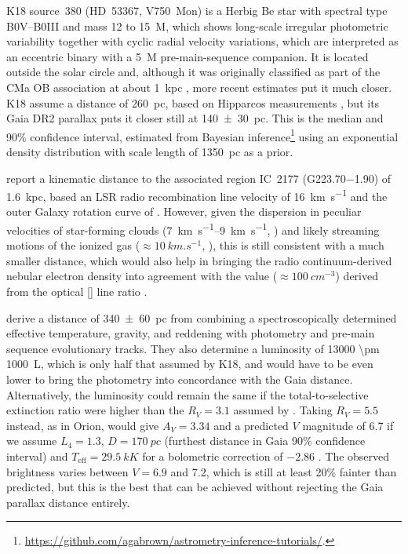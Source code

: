 \documentclass[useAMS, usenatbib, a4paper]{mnras}
\newcommand\hii{\ion{H}{ii}}
\begin{document}
K18 source~380 (HD~53367, V750~Mon) is a Herbig Be star with spectral
type B0V--B0III and mass 12 to \SI{15}{M_\odot}, which shows
long-scale irregular photometric variability \citep{Tjin-A-Djie:2001a,
  Pogodin:2006a} together with cyclic radial velocity variations,
which are interpreted as an eccentric binary with a \SI{5}{M_\odot}
pre-main-sequence companion.  It is located outside the solar circle
and, although it was originally classified as part of the CMa OB
association at about \SI{1}{kpc} \citep{Tjin-A-Djie:2001a}, more
recent estimates put it much closer.  K18 assume a distance of
\SI{260}{pc}, based on Hipparcos measurements
\citep{van-Leeuwen:2007a}, but its Gaia DR2 parallax
\citep{Gaia-Collaboration:2016a, Gaia-Collaboration:2018a, Luri:2018a}
puts it closer still at \SI{140 \pm 30}{pc}.  This is the median and
90\% confidence interval, estimated from Bayesian
inference\footnote{\url{https://github.com/agabrown/astrometry-inference-tutorials/}.}
using an exponential density distribution with scale length of
\SI{1350}{pc} as a prior.

\citet{Quireza:2006b} report a kinematic distance to the associated
\hii{} region IC~2177 (G\num{223.70}\num{-1.90}) of \SI{1.6}{kpc},
based an LSR radio recombination line velocity of \SI{+16}{km.s^{-1}}
\citep{Quireza:2006a} and the outer Galaxy rotation curve of
\citet{Brand:1993a}.  However, given the dispersion in peculiar
velocities of star-forming clouds (\SIrange{7}{9}{km.s^{-1}},
\citealp{Stark:1984a}) and likely streaming motions of the ionized gas
(\(\approx \SI{10}{km.s^{-1}}\), \citealp{Matzner:2002a, Lee:2012a}),
this is still consistent with a much smaller distance, which would
also help in bringing the radio continuum-derived nebular electron
density into agreement with the value (\(\approx \SI{100}{cm^{-3}}\))
derived from the optical [] line ratio
\citep{Hawley:1978a}.

\citet{Fairlamb:2015a} derive a distance of \SI{340 \pm 60}{pc} from
combining a spectroscopically determined effective temperature,
gravity, and reddening with photometry and pre-main sequence
evolutionary tracks.  They also determine a luminosity of \SI{13000
  \pm 1000}{L_\odot}, which is only half that assumed by K18, and
would have to be even lower to bring the photometry into concordance
with the Gaia distance.  Alternatively, the luminosity could remain
the same if the total-to-selective extinction ratio were higher than
the \(R_V = 3.1\) assumed by \citet{Fairlamb:2015a}.  Taking
\(R_V = 5.5\) instead, as in Orion, would give \(A_V = 3.34\) and a
predicted \(V\) magnitude of 6.7 if we assume \(L_4 = 1.3\),
\(D = \SI{170}{pc}\) (furthest distance in Gaia 90\% confidence
interval) and \(T_{\text{eff}} = \SI{29.5}{kK}\)
\citep{Fairlamb:2015a} for a bolometric correction of \(-2.86\)
\citep{Nieva:2013a}.  The observed brightness varies between
\(V = 6.9\) and 7.2, which is still at least 20\% fainter than
predicted, but this is the best that can be achieved without rejecting
the Gaia parallax distance entirely.
\end{document}
